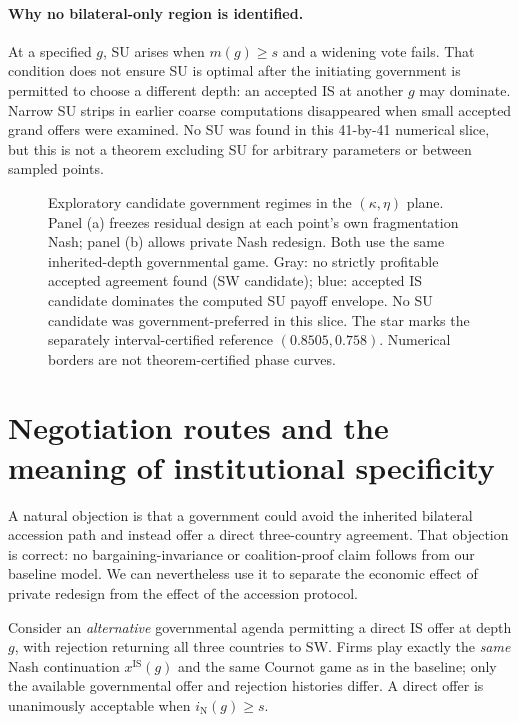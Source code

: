 \documentclass[11pt,a4paper]{article}
\theoremstyle{remark}\newtheorem{remark}[theorem]{Remark}
\newcommand{\SW}{\mathrm{SW}}\newcommand{\SU}{\mathrm{SU}}\newcommand{\IS}{\mathrm{IS}}
\newcommand{\N}{\mathrm{N}}\newcommand{\F}{\mathrm{F}}
\begin{document}
\paragraph{Why no bilateral-only region is identified.}
At a specified $g$, SU arises when $m(g)\ge s$ and a widening vote fails. That condition does not ensure SU is optimal after the initiating government is permitted to choose a different depth: an accepted IS at another $g$ may dominate. Narrow SU strips in earlier coarse computations disappeared when small accepted grand offers were examined. No SU was found in this 41-by-41 numerical slice, but this is not a theorem excluding SU for arbitrary parameters or between sampled points.

\begin{figure}[H]
\centering
\resizebox{0.98\linewidth}{!}{}
\caption{Exploratory candidate government regimes in the $(\kappa,\eta)$ plane. Panel (a) freezes residual design at each point's own fragmentation Nash; panel (b) allows private Nash redesign. Both use the same inherited-depth governmental game. Gray: no strictly profitable accepted agreement found (SW candidate); blue: accepted IS candidate dominates the computed SU payoff envelope. No SU candidate was government-preferred in this slice. The star marks the separately interval-certified reference $(0.8505,0.758)$. Numerical borders are not theorem-certified phase curves.}
\label{fig:phase}
\end{figure}

\section{Negotiation routes and the meaning of institutional specificity}\label{sec:institution}
A natural objection is that a government could avoid the inherited bilateral accession path and instead offer a direct three-country agreement. That objection is correct: no bargaining-invariance or coalition-proof claim follows from our baseline model. We can nevertheless use it to separate the economic effect of private redesign from the effect of the accession protocol.

Consider an \emph{alternative} governmental agenda permitting a direct $\IS$ offer at depth $g$, with rejection returning all three countries to $\SW$. Firms play exactly the \emph{same} Nash continuation $x^{\IS}(g)$ and the same Cournot game as in the baseline; only the available governmental offer and rejection histories differ. A direct offer is unanimously acceptable when $i_{\N}(g)\ge s$.
\end{document}
